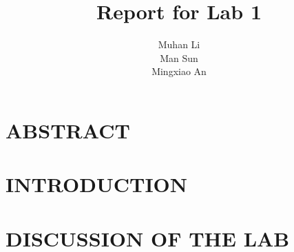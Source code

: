 \documentclass[12pt,letterpaper,onecolumn]{article}
\title{\titlefont Report for Lab 1\vspace{300pt}}
\author{\authorfont Muhan Li\\ \authorfont Man Sun\\ \authorfont Mingxiao An}
\date{}
\begin{document}
	\maketitle
	\thispagestyle{empty}
	\newpage
	\tableofcontents
	\newpage
	\section{ABSTRACT}	
		
	\section{INTRODUCTION}
		
	\section{DISCUSSION OF THE LAB}
		
\end{document}

